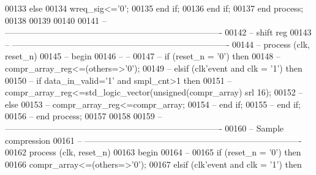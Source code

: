 \begin{DoxyCode}
00133         \textcolor{keywordflow}{else} 
00134           \textcolor{vhdlchar}{wreq_sig}\textcolor{vhdlchar}{<=}\textcolor{vhdlchar}{'}\textcolor{vhdllogic}{}\textcolor{vhdllogic}{0}\textcolor{vhdlchar}{'}; 
00135         \textcolor{keywordflow}{end} \textcolor{keywordflow}{if};
00136         \textcolor{keywordflow}{end} \textcolor{keywordflow}{if};
00137     \textcolor{keywordflow}{end} \textcolor{keywordflow}{process};    
00138     
00139     
00140     
00141 \textcolor{keyword}{-- ----------------------------------------------------------------------------}
00142 \textcolor{keyword}{-- shift reg}
00143 \textcolor{keyword}{-- ----------------------------------------------------------------------------}
00144 \textcolor{keyword}{-- process (clk, reset\_n)}
00145 \textcolor{keyword}{--  begin}
00146 \textcolor{keyword}{--      --}
00147 \textcolor{keyword}{--      if (reset\_n = '0') then}
00148 \textcolor{keyword}{--              compr\_array\_reg<=(others=>'0');}
00149 \textcolor{keyword}{--      elsif (clk'event and clk = '1') then}
00150 \textcolor{keyword}{--        if data\_in\_valid='1' and smpl\_cnt>1 then}
00151 \textcolor{keyword}{--          compr\_array\_reg<=std\_logic\_vector(unsigned(compr\_array) srl 16);}
00152 \textcolor{keyword}{--        else }
00153 \textcolor{keyword}{--          compr\_array\_reg<=compr\_array;}
00154 \textcolor{keyword}{--        end if;}
00155 \textcolor{keyword}{--      end if;}
00156 \textcolor{keyword}{--  end process;    }
00157     
00158   
00159 \textcolor{keyword}{-- ----------------------------------------------------------------------------}
00160 \textcolor{keyword}{-- Sample compression}
00161 \textcolor{keyword}{-- ----------------------------------------------------------------------------}
00162  \textcolor{keywordflow}{process} (clk, reset_n)
00163 \textcolor{vhdlkeyword}{    begin}
00164 \textcolor{keyword}{        --}
00165         \textcolor{keywordflow}{if} \textcolor{vhdlchar}{(}\textcolor{vhdlchar}{reset_n} \textcolor{vhdlchar}{=} \textcolor{vhdlchar}{'}\textcolor{vhdllogic}{}\textcolor{vhdllogic}{0}\textcolor{vhdlchar}{'}\textcolor{vhdlchar}{)} \textcolor{keywordflow}{then}
00166             \textcolor{vhdlchar}{compr_array}\textcolor{vhdlchar}{<=}\textcolor{vhdlchar}{(}\textcolor{keywordflow}{others}\textcolor{vhdlchar}{=}\textcolor{vhdlchar}{>}\textcolor{vhdlchar}{'}\textcolor{vhdllogic}{}\textcolor{vhdllogic}{0}\textcolor{vhdlchar}{'}\textcolor{vhdlchar}{)};
00167         \textcolor{keywordflow}{elsif} \textcolor{vhdlchar}{(}\textcolor{vhdlchar}{clk}\textcolor{vhdlchar}{'}\textcolor{vhdlkeyword}{event} \textcolor{keywordflow}{and} \textcolor{vhdlchar}{clk} \textcolor{vhdlchar}{=} \textcolor{vhdlchar}{'}\textcolor{vhdllogic}{}\textcolor{vhdllogic}{1}\textcolor{vhdlchar}{'}\textcolor{vhdlchar}{)} \textcolor{keywordflow}{then}          

\end{DoxyCode}
